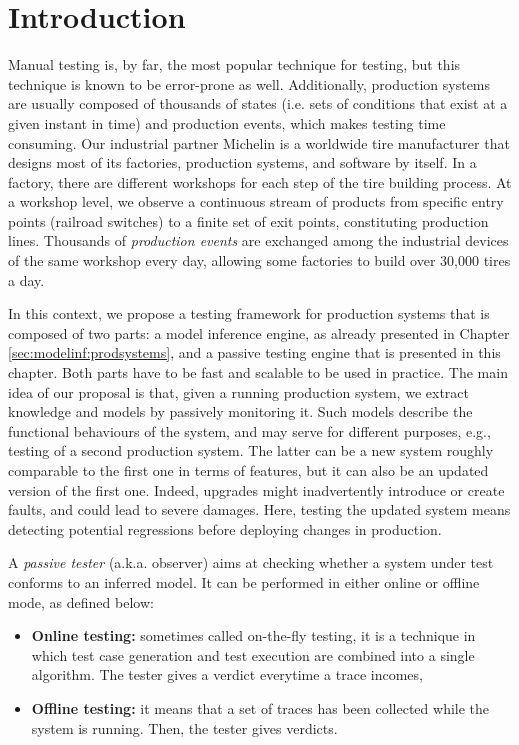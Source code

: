 \section{Introduction}
\label{sec:testing:intro}

Manual testing is, by far, the most popular technique for
testing, but this technique is known to be error-prone as well.
Additionally, production systems are usually composed of
thousands of states (i.e. sets of conditions that exist at a
given instant in time) and production events, which makes
testing time consuming. Our industrial partner Michelin is a
worldwide tire manufacturer that designs most of its factories,
production systems, and software by itself. In a factory, there
are different workshops for each step of the tire building
process. At a workshop level, we observe a continuous stream of
products from specific entry points (railroad switches) to a
finite set of exit points, constituting production lines.
Thousands of \emph{production events} are exchanged among the
industrial devices of the same workshop every day, allowing some
factories to build over 30,000 tires a day.

In this context, we propose a testing framework for production
systems that is composed of two parts: a model inference engine,
as already presented in Chapter \ref{sec:modelinf:prodsystems},
and a passive testing engine that is presented in this chapter.
Both parts have to be fast and scalable to be used in practice.
The main idea of our proposal is that, given a running production
system, we extract knowledge and models by passively monitoring
it. Such models describe the functional behaviours of the system,
and may serve for different purposes, e.g., testing of a second
production system. The latter can be a new system roughly
comparable to the first one in terms of features, but it can also
be an updated version of the first one. Indeed, upgrades might
inadvertently introduce or create faults, and could lead to
severe damages. Here, testing the updated system means detecting
potential regressions before deploying changes in production.

A \textit{passive tester} (a.k.a. observer) aims at checking
whether a system under test conforms to an inferred model. It can
be performed in either online or offline mode, as defined below:

\begin{itemize}
\item \textbf{Online testing:} sometimes called on-the-fly
testing, it is a technique in which test case generation and test
execution are combined into a single algorithm. The tester gives
a verdict everytime a trace incomes,

\item \textbf{Offline testing:} it means that a set of traces has
been collected while the system is running. Then, the tester
gives verdicts.
\end{itemize}

